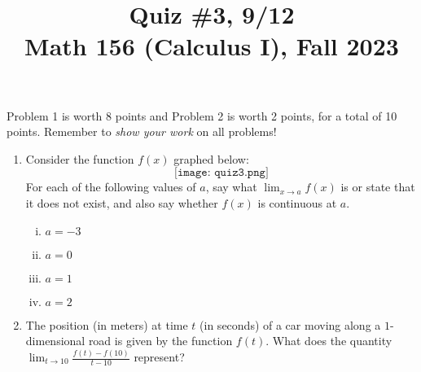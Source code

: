 \documentclass[11pt]{article}
\title{Quiz \#3, 9/12 \\ Math 156 (Calculus I), Fall 2023}
\date{}
\begin{document}
\maketitle

\thispagestyle{empty}

\vspace{-2cm}

Problem 1 is worth 8 points and Problem 2 is worth 2 points, for a total of 10 points. Remember to \emph{show your work} on all problems!

\begin{enumerate}
\item Consider the function $f(x)$ graphed below:
\[ \texttt{[image: quiz3.png]}\]
For each of the following values of $a$, say what $\displaystyle \lim_{x \to a} f(x)$ is or state that it does not exist, and also say whether $f(x)$ is continuous at $a$.
\begin{multicols}{2}
\begin{enumerate}[(i)]
\item $a=-3$
\item $a=0$
\item $a=1$
\item $a=2$
\end{enumerate}
\end{multicols}

\vspace{5cm}

\item The position (in meters) at time $t$ (in seconds) of a car moving along a $1$-dimensional road is given by the function $f(t)$. What does the quantity $\displaystyle \lim_{t \to 10} \frac{f(t) - f(10)}{t-10}$ represent?

\end{enumerate}
\end{document}
